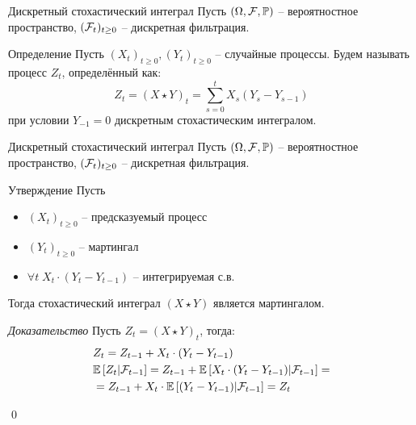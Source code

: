 \documentclass{beamer}
\begin{document}
\begin{frame}{Дискретный стохастический интеграл}
    Пусть $(\Omega, \mathcal{F}, \mathbb{P})$ -- вероятностное пространство, $(\mathcal{F}_t)_{t\geq 0}$ -- дискретная фильтрация.
    \begin{block}{Определение}
    Пусть $(X_t)_{t\geq 0}, (Y_t)_{t \geq 0}$ -- случайные процессы. Будем называть процесс $Z_t$, определённый как:
    $$
        Z_t = (X\star Y)_t = \sum_{s=0}^t X_s (Y_s-Y_{s-1})
    $$при условии $Y_{-1} = 0$ дискретным стохастическим интегралом.
    \end{block}
\end{frame}

\begin{frame}{Дискретный стохастический интеграл}
    Пусть $(\Omega, \mathcal{F}, \mathbb{P})$ -- вероятностное пространство, $(\mathcal{F}_t)_{t\geq 0}$ -- дискретная фильтрация.

    \begin{block}{Утверждение}
        Пусть 
        \begin{itemize}
            \item $(X_t)_{t\geq 0}$ -- предсказуемый процесс
            \item $ (Y_t)_{t \geq 0}$ -- мартингал
            \item $\forall t \; X_t \cdot (Y_t-Y_{t-1})$ -- интегрируемая с.в. 
        \end{itemize}
        Тогда стохастический интеграл $(X\star Y)$ является мартингалом.
    \end{block}

    \textit{Доказательство}
    Пусть $Z_t = (X\star Y)_t$, тогда:
    \begin{align*}
        & Z_{t} = Z_{t-1} + X_t \cdot (Y_t - Y_{t-1}) \\
        & \mathbb{E} \left[ Z_t | \mathcal{F}_{t-1} \right] = Z_{t-1} + 
        \mathbb{E} \left[ X_t \cdot (Y_t - Y_{t-1}) | \mathcal{F}_{t-1} \right]
        = \\& =Z_{t-1} + X_t \cdot \mathbb{E} \left[ (Y_t - Y_{t-1}) | \mathcal{F}_{t-1} \right] = Z_t
    \end{align*}

    \qed

\end{frame}
\end{document}
